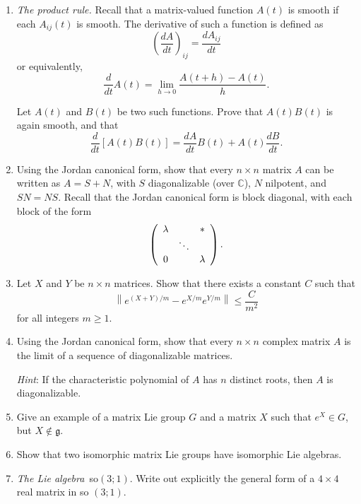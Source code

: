 \documentclass[12pt]{amsbook}
\let \frak = \mathfrak
\theoremstyle{plain}
\numberwithin{equation}{chapter}
\numberwithin{theorem}{chapter}
\begin{document}
\begin{enumerate}
\item \label{product.rule}\textit{The product rule}\emph{.} Recall that a
matrix-valued function $A(t)$ is smooth if each $A_{ij}(t)$ is smooth. The
derivative of such a function is defined as
\[
\left(  \frac{dA}{dt}\right)  _{ij}=\frac{dA_{ij}}{dt}%
\]
or equivalently,
\[
\frac{d}{dt}A(t)=\lim_{h\rightarrow0}\frac{A(t+h)-A(t)}{h}\text{.}%
\]

Let $A(t)$ and $B(t)$ be two such functions. Prove that $A(t)B(t)$ is again
smooth, and that
\[
\frac{d}{dt}\left[  A(t)B(t)\right]  =\frac{dA}{dt}B(t)+A(t)\frac{dB}%
{dt}\text{.}%
\]

\item \label{decomposition}Using the Jordan canonical form, show that every
$n\times n$ matrix $A$ can be written as $A=S+N$, with $S$ diagonalizable
(over $\mathbb{C}$), $N$ nilpotent, and $SN=NS$. Recall that the Jordan
canonical form is block diagonal, with each block of the form
\[
\left(
\begin{array}
[c]{ccc}%
\lambda &  & \ast\\
& \ddots & \\
0 &  & \lambda
\end{array}
\right)  \text{.}%
\]

\item \label{lie.product}Let $X$ and $Y$ be $n\times n$ matrices. Show that
there exists a constant $C$ such that
\[
\left\|  e^{(X+Y)/m}-e^{X/m}e^{Y/m}\right\|  \leq\frac{C}{m^{2}}%
\]
for all integers $m\geq1$.

\item \label{diagonal.limit}Using the Jordan canonical form, show that every
$n\times n$ complex matrix $A$ is the limit of a sequence of diagonalizable matrices.

\textit{Hint}: If the characteristic polynomial of $A$ has $n$ distinct roots,
then $A$ is diagonalizable.

\item  Give an example of a matrix Lie group $G$ and a matrix $X$ such that
$e^{X}\in G$, but $X\notin\frak{g}$.

\item \label{isomorphism}Show that two isomorphic matrix Lie groups have
isomorphic Lie algebras.

\item \label{so31}\textit{The Lie algebra}\emph{\ }\textsf{so}$(3;1)$. Write
out explicitly the general form of a $4\times4$ real matrix in \textsf{so}%
$(3;1)$.


\end{enumerate}
\end{document}
